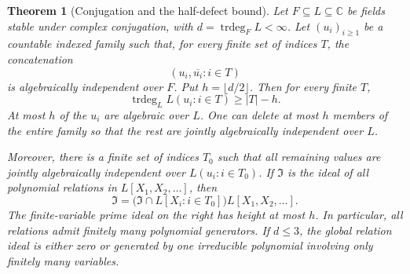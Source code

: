 \documentclass[11pt]{article}
\newtheorem{theorem}{Theorem}[section]
\theoremstyle{definition}
\theoremstyle{remark}
\begin{document}
\begin{theorem}[Conjugation and the half-defect bound]
\label{rdef:main}
Let $F\subseteq L\subseteq\mathbb C$ be fields stable under complex
conjugation, with $d=\operatorname{trdeg}_F L<\infty$. Let
$(u_i)_{i\ge1}$ be a countable indexed family such that, for every
finite set of indices $T$, the concatenation
\[
                       (u_i,\overline{u_i}:i\in T)
\]
is algebraically independent over $F$. Put $h=\lfloor d/2\rfloor$.
Then for every finite $T$,
\begin{equation}\label{rdef:rank}
 \operatorname{trdeg}_L L(u_i:i\in T)\ge |T|-h.
\end{equation}
At most $h$ of the $u_i$ are algebraic over $L$. One can delete
at most $h$ members of the entire family so that the rest are jointly
algebraically independent over $L$.

Moreover, there is a finite set of indices $T_0$ such that all remaining
values are jointly algebraically independent over $L(u_i:i\in T_0)$.
If $\mathfrak I$ is the ideal of all polynomial relations in
$L[X_1,X_2,\ldots]$, then
\begin{equation}\label{rdef:finite-core}
 \mathfrak I=
  \bigl(\mathfrak I\cap L[X_i:i\in T_0]\bigr)
                         L[X_1,X_2,\ldots].
\end{equation}
The finite-variable prime ideal on the right has height at most $h$.
In particular, all relations admit finitely many polynomial generators.
If $d\le3$, the global relation ideal is either zero or generated by
one irreducible polynomial involving only finitely many variables.
\end{theorem}
\end{document}
